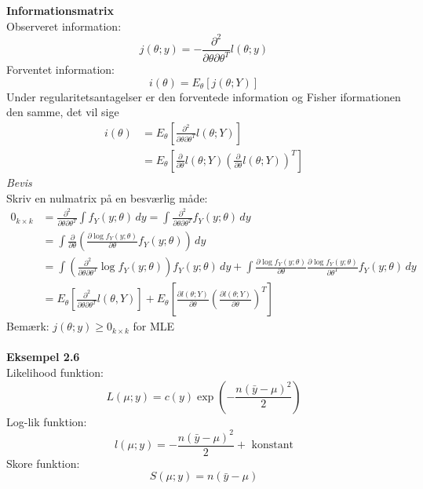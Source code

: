 \documentclass[12pt,a4paper]{report}
\begin{document}
\textbf{Informationsmatrix}\\
Observeret information:
\begin{equation}
j(\theta;y)=-\frac{\partial^2}{\partial\theta\partial\theta^T}l(\theta;y)
\end{equation}
Forventet information:
\begin{equation}
i(\theta)=E_{\theta}\left[j(\theta;Y)\right]
\end{equation}
Under regularitetsantagelser er den forventede information og Fisher iformationen den samme, det vil sige
\begin{align*}
i(\theta)&=E_{\theta}\left[\frac{\partial^2}{\partial\theta\partial\theta^T}l(\theta;Y)\right]\\
&=E_{\theta}\left[\frac{\partial}{\partial\theta}l(\theta;Y)\left(\frac{\partial}{\partial\theta}l(\theta;Y)\right)^T\right]
\end{align*}
\textit{Bevis}\\
Skriv en nulmatrix på en besværlig måde:
\begin{align*}
0_{k\times k}&=\frac{\partial^2}{\partial\theta\partial\theta^T}\int\!f_Y(y;\theta)\,dy=\int\!\frac{\partial^2}{\partial\theta\partial\theta^T}f_Y(y;\theta)\,dy\\
&=\int\!\frac{\partial}{\partial\theta}\left(\frac{\partial\log f_Y(y;\theta)}{\partial\theta}f_Y(y;\theta)\right)\,dy\\
&=\int\!\left(\frac{\partial^2}{\partial\theta\partial\theta^T}\log f_Y(y;\theta)\right)f_Y(y;\theta)\,dy+\int\!\frac{\partial\log f_Y(y;\theta)}{\partial\theta}\frac{\partial\log f_Y(y;\theta)}{\partial\theta^T}f_Y(y;\theta)\,dy\\
&=E_{\theta}\left[\frac{\partial^2}{\partial\theta\partial\theta^T}l(\theta,Y)\right]+E_{\theta}\left[\frac{\partial l(\theta;Y)}{\partial\theta}\left(\frac{\partial l(\theta;Y)}{\partial\theta}\right)^T\right]
\end{align*}
Bemærk: $j(\theta;y)\geq0_{k\times k}$ for MLE\\\\
\textbf{Eksempel 2.6}\\
Likelihood funktion:
\begin{equation}
L(\mu;y)=c(y)\exp\left(-\frac{n(\bar{y}-\mu)^2}{2}\right)
\end{equation}
Log-lik funktion:
\begin{equation}
l(\mu;y)=-\frac{n(\bar{y}-\mu)^2}{2}+\text{ konstant}
\end{equation}
Skore funktion:
\begin{equation}
S(\mu;y)=n(\bar{y}-\mu)
\end{equation}
\end{document}
